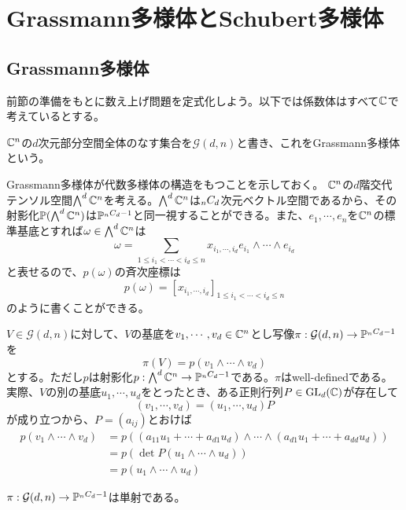 \documentclass{ltjsreport}
\begin{document}
\section{Grassmann多様体とSchubert多様体}
\subsection{Grassmann多様体}

前節の準備をもとに数え上げ問題を定式化しよう。以下では係数体はすべて$\mathbb{C}$で考えているとする。

\begin{defin}
  $\mathbb{C}^{n}$の$d$次元部分空間全体のなす集合を$\mathcal{G}(d,n)$と書き、これをGrassmann多様体という。
\end{defin}

Grassmann多様体が代数多様体の構造をもつことを示しておく。
$\mathbb{C}^n$の$d$階交代テンソル空間$\bigwedge^d\mathbb{C}^n$を考える。$\bigwedge^d\mathbb{C}^n$は$_{n}C_{d}$次元ベクトル空間であるから、その射影化$\mathbb{P}(\bigwedge^d\mathbb{C}^n)$は$\mathbb{P}^{_{n}C_{d}-1}$と同一視することができる。また、$e_1,\cdots,e_n$を$\mathbb{C}^n$の標準基底とすれば$\omega\in\bigwedge^d\mathbb{C}^n$は
\[
\omega=\sum_{1\leq i_1<\cdots <i_d\leq n}x_{i_1,\cdots, i_d}e_{i_1}\wedge\cdots\wedge e_{i_d}  
\]
と表せるので、$p(\omega)$の斉次座標は
\[
p(\omega)=[x_{i_1,\cdots,i_d}]_{1\leq i_1<\cdots<i_d\leq n}  
\]
のように書くことができる。

$V\in\mathcal{G}(d,n)$に対して、$V$の基底を$v_1,\cdots,v_d\in\mathbb{C}^n$とし写像$\pi:\mathcal{G}(d,n)\rightarrow \mathbb{P}^{_{n}C_{d}-1}$を
\[
\pi(V)=p(v_1\wedge\cdots\wedge v_d)  
\]
とする。ただし$p$は射影化$p:\bigwedge^d\mathbb{C}^n\rightarrow \mathbb{P}^{_{n}C_{d}-1}$である。$\pi$はwell-definedである。実際、$V$の別の基底$u_1,\cdots,u_d$をとったとき、ある正則行列$P\in\text{GL}_d(\mathbb{C})$が存在して
\[
(v_1,\cdots,v_d)=(u_1,\cdots,u_d)P  
\]
が成り立つから、$P=(a_{ij})$とおけば
\begin{align*}
  p(v_1\wedge\cdots\wedge v_d)
  &=p\left(
    (a_{11}u_1+\cdots+a_{d1}u_d)\wedge\cdots\wedge
    (a_{d1}u_1+\cdots+a_{dd}u_d)
  \right)\\
  &=p(\det P(u_1\wedge\cdots\wedge u_d))\\
  &=p(u_1\wedge\cdots\wedge u_d)
\end{align*}

\begin{prop}[Plucker埋め込み]\label{plucker}
  $\pi:\mathcal{G}(d,n)\rightarrow \mathbb{P}^{_{n}C_{d}-1}$は単射である。
\end{prop}
\end{document}
